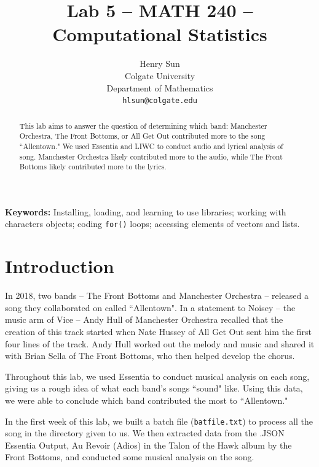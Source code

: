 \documentclass{article}\usepackage[]{graphicx}\usepackage[]{xcolor}
\begin{document}
\vspace{-1in}
\title{Lab 5 -- MATH 240 -- Computational Statistics}

\author{
  Henry Sun \\
  Colgate University  \\
  Department of Mathematics  \\
  {\tt hlsun@colgate.edu}
}

\date{}

\maketitle

\begin{multicols}{2}
\begin{abstract}
This lab aims to answer the question of determining which band: Manchester Orchestra, The Front Bottoms, or All Get Out contributed more to the song ``Allentown." We used Essentia and LIWC to conduct audio and lyrical analysis of song. Manchester Orchestra likely contributed more to the audio, while The Front Bottoms likely contributed more to the lyrics.
\end{abstract}

\noindent \textbf{Keywords:} Installing, loading, and learning to use libraries; working with characters objects; coding \texttt{for()} loops; accessing elements of vectors and lists.

\section{Introduction}
\indent  
In 2018, two bands -- The Front Bottoms and Manchester Orchestra -- released a song they collaborated on called ``Allentown". In a statement to Noisey \citep{vice} -- the music arm of Vice -- Andy Hull of Manchester Orchestra recalled that the creation of this track started when Nate Hussey of All Get Out sent him the first four lines of the track. Andy Hull worked out the melody and music and shared it with Brian Sella of The Front Bottoms, who then helped develop the chorus. 

\indent Throughout this lab, we used Essentia \citep{essentia} to conduct musical analysis on each song, giving us a rough idea of what each band's songs ``sound" like. Using this data, we were able to conclude which band contributed the most to ``Allentown."

\indent In the first week of this lab, we built a batch file (\texttt{batfile.txt}) to process all the song in the directory given to us. We then extracted data from the .JSON Essentia Output, Au Revoir (Adios) in the Talon of the Hawk album by the Front Bottoms, and conducted some musical analysis on the song. 


\end{multicols}
\end{document}
